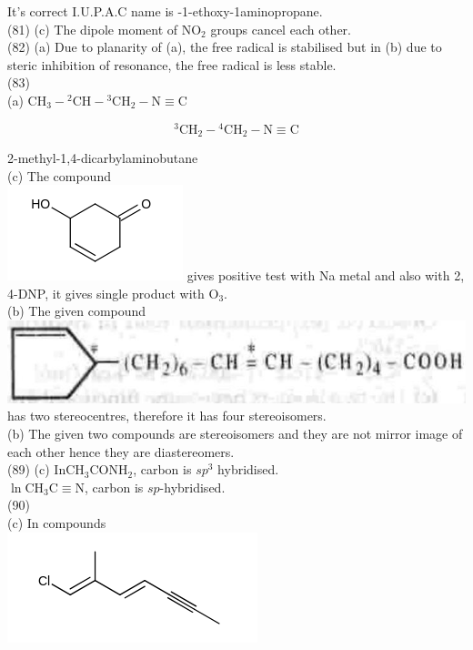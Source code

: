\documentclass[10pt]{article}
\begin{document}
It's correct I.U.P.A.C name is -1-ethoxy-1aminopropane.\\
(81) (c) The dipole moment of $\mathrm{NO}_{2}$ groups cancel each other.\\
(82) (a) Due to planarity of (a), the free radical is stabilised but in (b) due to steric inhibition of resonance, the free radical is less stable.\\
(83)\\
(a) $\mathrm{CH}_{3}-{ }^{2} \mathrm{CH}-{ }^{3} \mathrm{CH}_{2}-\mathrm{N} \equiv \mathrm{C}$

$$
{ }^{3} \mathrm{CH}_{2}-{ }^{4} \mathrm{CH}_{2}-\mathrm{N} \equiv \mathrm{C}
$$

2-methyl-1,4-dicarbylaminobutane\\
(c) The compound\\
\includegraphics{smile-3786b736a8ac86542fc85f4e4e75e4ac5e45250d} gives positive test with Na metal and also with 2, 4-DNP, it gives single product with $\mathrm{O}_{3}$.\\
(b) The given compound\\
\includegraphics[max width=\textwidth, center]{2025_01_28_8470952b98110cec3aabg-160(1)}\\
has two stereocentres, therefore it has four stereoisomers.\\
(b) The given two compounds are stereoisomers and they are not mirror image of each other hence they are diastereomers.\\
(89) (c) $\mathrm{In} \mathrm{CH}_{3} \mathrm{CONH}_{2}$, carbon is $s p^{3}$ hybridised.\\
$\ln \mathrm{CH}_{3} \mathrm{C} \equiv \mathrm{N}$, carbon is $s p$-hybridised.\\
(90)\\
(c) In compounds\\
\includegraphics{smile-44d568d65cf0bb1655ce603ae9ef80899940b153}\\
\end{document}

